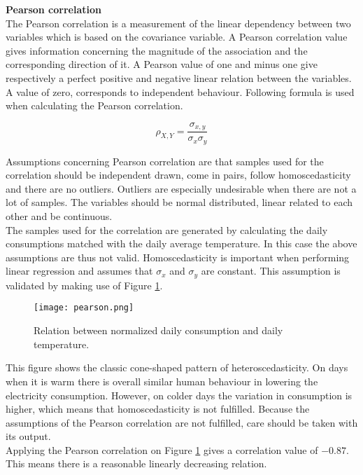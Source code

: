 \textbf{Pearson correlation}\\
The Pearson correlation is a measurement of the linear dependency between two variables which is based on the covariance variable. A Pearson correlation value gives information concerning the magnitude of the association and the corresponding direction of it. A Pearson value of one and minus one give respectively a perfect positive and negative linear relation between the variables. A value of zero, corresponds to independent behaviour. Following formula is used when calculating the Pearson correlation. 

\begin{equation}\label{eq:pearson}
	\rho_{X,Y} = \frac{\sigma_{x,y}}{\sigma_x\sigma_y}
\end{equation}

Assumptions concerning Pearson correlation are that samples used for the correlation should be independent drawn, come in pairs, follow homoscedasticity and there are no outliers. Outliers are especially undesirable when there are not a lot of samples. The variables should be normal distributed, linear related to each other and be continuous.\\
The samples used for the correlation are generated by calculating the daily consumptions matched with the daily average temperature. In this case the above assumptions are thus not valid. Homoscedasticity is important when performing linear regression and assumes that $ \sigma_x $ and $ \sigma_y $ are constant. This assumption is validated by making use of Figure \ref{fig:pearson}.

\begin{figure}[h!]
	\centering
	\texttt{[image: pearson.png]}
	\caption{Relation between normalized daily consumption and daily temperature.}
	\label{fig:pearson}
\end{figure}

This figure shows the classic cone-shaped pattern of heteroscedasticity. On days when it is warm there is overall similar human behaviour in lowering the electricity consumption. However, on colder days the variation in consumption is higher, which means that homoscedasticity is not fulfilled. Because the assumptions of the Pearson correlation are not fulfilled, care should be taken with its output.\\

Applying the Pearson correlation on Figure \ref{fig:pearson} gives a correlation value of $ -0.87 $. This means there is a reasonable linearly decreasing relation.\\


